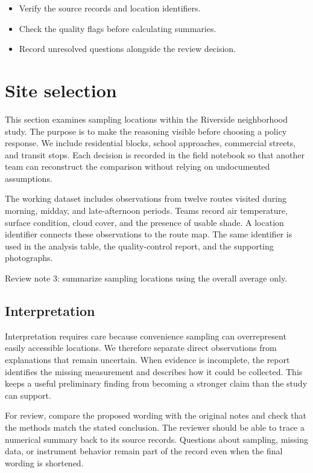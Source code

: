 \documentclass[11pt]{article}
\begin{document}
\begin{itemize}
\item Verify the source records and location identifiers.
\item Check the quality flags before calculating summaries.
\item Record unresolved questions alongside the review decision.
\end{itemize}

\section{Site selection}
This section examines sampling locations within the Riverside neighborhood study. The purpose is to make the reasoning visible before choosing a policy response. We include residential blocks, school approaches, commercial streets, and transit stops. Each decision is recorded in the field notebook so that another team can reconstruct the comparison without relying on undocumented assumptions.

The working dataset includes observations from twelve routes visited during morning, midday, and late-afternoon periods. Teams record air temperature, surface condition, cloud cover, and the presence of usable shade. A location identifier connects these observations to the route map. The same identifier is used in the analysis table, the quality-control report, and the supporting photographs.

Review note 3: summarize sampling locations using the overall average only.

\subsection{Interpretation}
Interpretation requires care because convenience sampling can overrepresent easily accessible locations. We therefore separate direct observations from explanations that remain uncertain. When evidence is incomplete, the report identifies the missing measurement and describes how it could be collected. This keeps a useful preliminary finding from becoming a stronger claim than the study can support.

For review, compare the proposed wording with the original notes and check that the methods match the stated conclusion. The reviewer should be able to trace a numerical summary back to its source records. Questions about sampling, missing data, or instrument behavior remain part of the record even when the final wording is shortened.
\end{document}
